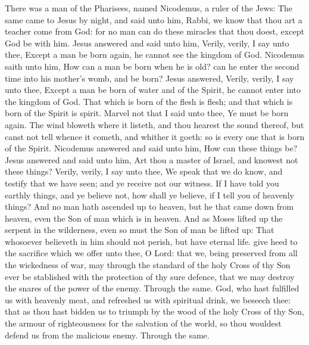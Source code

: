  There was a man of the Pharisees, named Nicodemus, a ruler of the Jews: The same came to Jesus by night, and said unto him, Rabbi, we know that thou art a teacher come from God: for no man can do these miracles that thou doest, except God be with him. Jesus answered and said unto him, Verily, verily, I say unto thee, Except a man be born again, he cannot see the kingdom of God. Nicodemus saith unto him, How can a man be born when he is old? can he enter the second time into his mother's womb, and be born? Jesus answered, Verily, verily, I say unto thee, Except a man be born of water and of the Spirit, he cannot enter into the kingdom of God. That which is born of the flesh is flesh; and that which is born of the Spirit is spirit. Marvel not that I said unto thee, Ye must be born again. The wind bloweth where it listeth, and thou hearest the sound thereof, but canst not tell whence it cometh, and whither it goeth: so is every one that is born of the Spirit. Nicodemus answered and said unto him, How can these things be? Jesus answered and said unto him, Art thou a master of Israel, and knowest not these things? Verily, verily, I say unto thee, We speak that we do know, and testify that we have seen; and ye receive not our witness. If I have told you earthly things, and ye believe not, how shall ye believe, if I tell you of heavenly things? And no man hath ascended up to heaven, but he that came down from heaven, even the Son of man which is in heaven. And as Moses lifted up the serpent in the wilderness, even so must the Son of man be lifted up: That whosoever believeth in him should not perish, but have eternal life.
\secret
{} give heed to the sacrifice which we offer unto thee, O Lord: that we, being preserved from all the wickedness of war, may through the standard of the holy Cross of thy Son ever be stablished with the protection of thy sure defence, that we may destroy the snares of the power of the enemy. Through the same.
\postcommunion
{} God, who hast fulfilled us with heavenly meat, and refreshed us with spiritual drink, we beseech thee: that as thou hast bidden us to triumph by the wood of the holy Cross of thy Son, the armour of righteousness for the salvation of the world, so thou wouldest defend us from the malicious enemy. Through the same.


